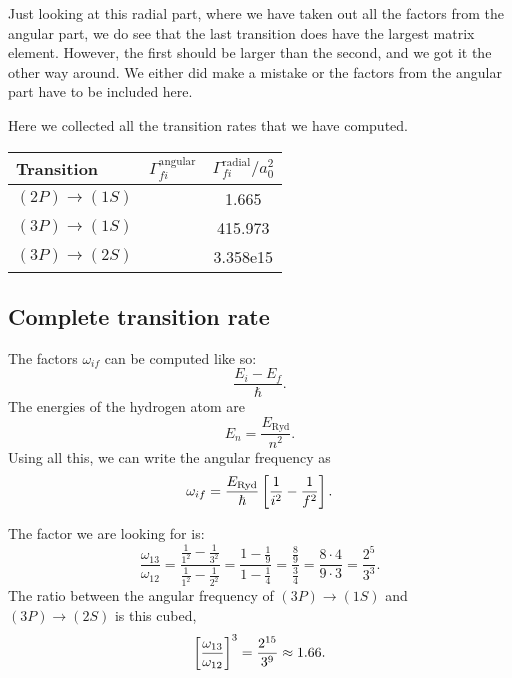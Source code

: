 \documentclass[11pt, english, fleqn, DIV=15, headinclude, BCOR=1.5cm]{scrartcl}
\newcommand\an{^\text{angular}}
\newcommand\ra{^\text{radial}}
\begin{document}
Just looking at this radial part, where we have taken out all the factors from
the angular part, we do see that the last transition does have the largest
matrix element. However, the first should be larger than the second, and we got
it the other way around. We either did make a mistake or the factors from the
angular part have to be included here.

Here we collected all the transition rates that we have computed.

\begin{tabular}{lcS}
    Transition & {$\Gamma_{fi}\an$} & {$\Gamma_{fi}\ra / a_0^2$} \\
    \midrule
    $(2P) \to (1S)$ & & 1.665 \\
    $(3P) \to (1S)$ & & 415.973 \\
    $(3P) \to (2S)$ & & 3.358e15
\end{tabular}

\subsection{Complete transition rate}

The factors $\omega_{if}$ can be computed like so:
\[
    \frac{E_i - E_f}\hbar.
\]
The energies of the hydrogen atom are
\[
    E_n = \frac{E_\text{Ryd}}{n^2}.
\]
Using all this, we can write the angular frequency as
\[
    \omega_{if} = \frac{E_\text{Ryd}}\hbar \left[ \frac{1}{i^2} - \frac{1}{f^2} \right].
\]

The factor we are looking for is:
\[
    \frac{\omega_{13}}{\omega_{12}}
    = \frac{\frac{1}{1^2} - \frac{1}{3^2}}{\frac{1}{1^2} - \frac{1}{2^2}}
    = \frac{1 - \frac{1}{9}}{1 - \frac{1}{4}}
    = \frac{\frac{8}{9}}{\frac{3}{4}}
    = \frac{8 \cdot 4}{9 \cdot 3}
    = \frac{2^5}{3^3}.
\]
The ratio between the angular frequency of $(3P) \to (1S)$ and $(3P) \to (2S)$
is this cubed,
\[
    \left[ \frac{\omega_{13}}{\omega_{12}} \right]^3
    = \frac{2^{15}}{3^9} \approx \num{1.66}.
\]
\end{document}
